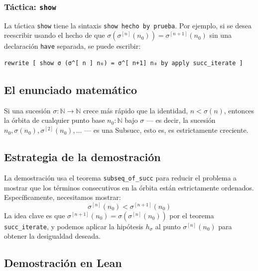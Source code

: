 \subsubsection{Táctica: \texttt{show}}

La táctica \texttt{show} tiene la sintaxis \texttt{show hecho by prueba}.
Por ejemplo, si se desea reescribir usando el hecho de que
$\sigma(\sigma^{[n]}(n_0)) = \sigma^{[n+1]}(n_0)$ sin una declaración
\texttt{have} separada, se puede escribir:

\begin{verbatim}
rewrite [ show σ (σ^[ n ] n₀) = σ^[ n+1] n₀ by apply succ_iterate ]
\end{verbatim}

\subsection{El enunciado matemático}

\begin{theorem}
Si una sucesión $\sigma : \mathbb{N} \to \mathbb{N}$ crece más rápido que
la identidad, $n < \sigma(n)$, entonces la órbita de cualquier punto base
$n_0 : \mathbb{N}$ bajo $\sigma$ --- es decir, la sucesión
$n_0, \sigma(n_0), \sigma^{[2]}(n_0), \ldots$ --- es una Subsucc, esto
es, es estrictamente creciente.
\end{theorem}

\subsection{Estrategia de la demostración}

La demostración usa el teorema \texttt{subseq\_of\_succ} para reducir el
problema a mostrar que los términos consecutivos en la órbita están
estrictamente ordenados. Específicamente, necesitamos mostrar:
\[
  \sigma^{[n]}(n_0) < \sigma^{[n+1]}(n_0)
\]
La idea clave es que $\sigma^{[n+1]}(n_0) = \sigma(\sigma^{[n]}(n_0))$
por el teorema \texttt{succ\_iterate}, y podemos aplicar la hipótesis
$h_\sigma$ al punto $\sigma^{[n]}(n_0)$ para obtener la desigualdad
deseada.

\subsection{Demostración en Lean}

